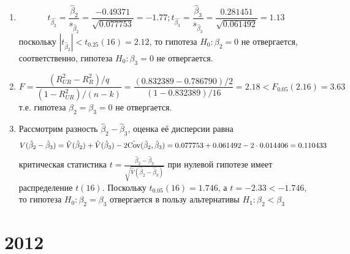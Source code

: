 \documentclass[pdftex,12pt,a4paper]{article}
\begin{document}
\begin{enumerate}
\begin{enumerate}
\item \begin{equation}
t_{\hat{\beta_2}}=\frac{\hat{\beta}_2}{s_{\hat{\beta}_2}}=\frac{-0.49371}{\sqrt{0.077753}}=-1.77; t_{\hat{\beta_3}}=\frac{\hat{\beta}_3}{s_{\hat{\beta}_3}}=\frac{0.281451}{\sqrt{0.061492}}=1.13
\end{equation}
поскольку $|t_{\hat{\beta}_2}|<t_{0.25}(16)=2.12$, то гипотеза $H_0: \beta_2=0$ не отвергается, соответственно, гипотеза $H_0:\beta_3=0$ не отвергается.
\item \begin{equation}
F=\frac{(R_{UR}^2-R_R^2)/q}{(1-R_{UR}^2)/(n-k)}=\frac{(0.832389-0.786790)/2}{(1-0.832389)/16}=2.18<F_{0.05}(2.16)=3.63
\end{equation} т.е. гипотеза $\beta_2=\beta_3=0$ не отвергается.
\item Рассмотрим разность $\hat{\beta}_2-\hat{\beta}_3$, оценка её дисперсии равна \begin{equation}
{V}(\hat{\beta}_2-\hat{\beta}_3)=\hat{V}(\hat{\beta}_2)+\hat{V}(\hat{\beta}_3)-2\hat{\operatorname{Cov}}(\hat{\beta}_2,\hat{\beta}_3)=0.077753+0.061492-2\cdot 0.014406=0.110433
\end{equation} критическая статистика $t=\frac{\hat{\beta}_2-\hat{\beta}_3}{\sqrt{\hat{V}(\hat{\beta}_2-\hat{\beta}_3)}}$ при нулевой гипотезе имеет распределение $t(16)$. Поскольку $t_{0.05}(16)=1.746$, а $t=-2.33<-1.746$, то гипотеза $H_0: \beta_2=\beta_3$ отвергается в пользу альтернативы $H_1:\beta_2<\beta_3$
\end{enumerate}
\end{enumerate}


\section{2012}
\end{document}
